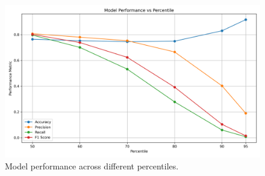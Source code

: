 \documentclass[conference,9pt]{IEEEtran}
\begin{document}
\begin{figure}[!t]
    \centering
    \includegraphics[width=.75\textwidth]{./performance_vs_percentile.png}
    \caption{Model performance across different percentiles.}
    \label{fig:perc}
\end{figure}
\end{document}
